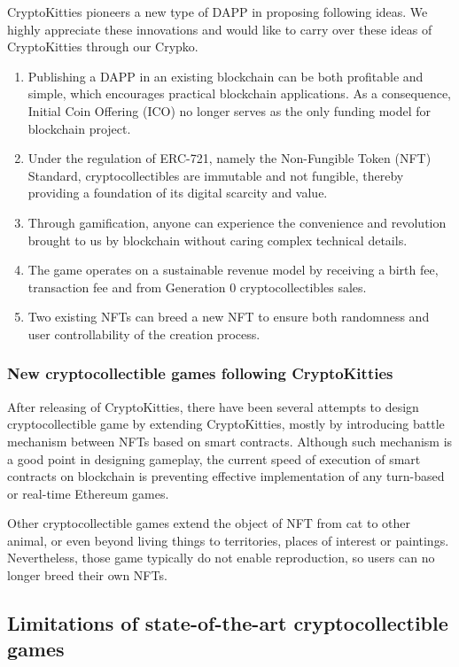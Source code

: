 \documentclass[b5paper]{article}
\begin{document}
CryptoKitties pioneers a new type of DAPP in proposing following ideas. 
We highly appreciate these innovations and would like to carry over these ideas of CryptoKitties through our Crypko.

\begin{enumerate}
\item Publishing a DAPP in an existing blockchain can be both profitable and simple, which encourages practical blockchain applications. As a consequence, Initial Coin Offering (ICO) no longer serves as the only funding model for blockchain project.
\item Under the regulation of ERC-721, namely the Non-Fungible Token (NFT) Standard, cryptocollectibles are immutable and not fungible, thereby providing a foundation of its digital scarcity and value.
\item Through gamification, anyone can experience the convenience and revolution brought to us by blockchain without caring complex technical details.
\item The game operates on a sustainable revenue model by receiving a birth fee, transaction fee and from Generation 0 cryptocollectibles sales.
\item Two existing NFTs can breed a new NFT to ensure both randomness and user controllability of the creation process.
\end{enumerate}


\subsubsection{New cryptocollectible games following CryptoKitties}
After releasing of CryptoKitties, there have been several attempts to design cryptocollectible game by extending CryptoKitties, 
mostly by introducing battle mechanism between NFTs\cite{cryptofighters,fishbank,cryptomons,etheremon} based on smart contracts. 
Although such mechanism is a good point in designing gameplay,
the current speed of execution of smart contracts on blockchain is preventing effective implementation of any turn-based or real-time Ethereum games.

Other cryptocollectible games extend the object of NFT from cat to other animal\cite{cryptopets,etheremon}, or even beyond living things to territories\cite{cryptocountries}, places of interest\cite{cryptolandmarks} or paintings\cite{cryptoarts}. 
Nevertheless, those game typically do not enable reproduction, 
so users can no longer breed their own NFTs.

\subsection{Limitations of state-of-the-art cryptocollectible games}
\end{document}
